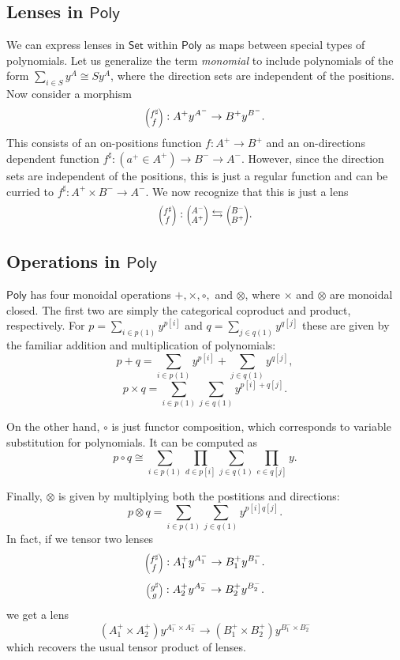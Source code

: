 \documentclass[12pt, a4paper]{article}
\theoremstyle{definition}
\theoremstyle{plain}
\theoremstyle{plain}
\theoremstyle{plain}
\theoremstyle{plain}
\theoremstyle{plain}
\theoremstyle{remark}
\theoremstyle{remark}
\newcommand{\lens}[2]{\scaleobj{0.6}{\begin{pmatrix} \scaleobj{1.3}{{#1}} \\ \scaleobj{1.3}{{#2}} \end{pmatrix}}}
\begin{document}
\subsection{Lenses in $\mathsf{Poly}$}
We can express lenses in $\mathsf{Set}$ within $\mathsf{Poly}$ as maps between special types of polynomials. Let us generalize the term \emph{monomial} to include polynomials of the form $\sum_{i \in S} y^{A} \cong S y^A$, where the direction sets are independent of the positions. Now consider a morphism
$$\lens{f^\sharp}{f} :A^+ y^{A^-} \rightarrow B^+ y^{B^-} .$$
This consists of an on-positions function $f: A^+ \rightarrow B^+$ and an on-directions dependent function $f^\sharp : (a^+ \in A^+) \rightarrow B^- \rightarrow A^-$. However, since the direction sets are independent of the positions, this is just a regular function and can be curried to $f^\sharp: A^+ \times B^- \rightarrow A^-$. We now recognize that this is just a lens
$$\lens{f^\sharp}{f} : \lens{A^-}{A^+} \leftrightarrows \lens{B^-}{B^+}.$$

\subsection{Operations in $\mathsf{Poly}$}
$\mathsf{Poly}$ has four monoidal operations $+, \times,\circ,$ and $\otimes$, where $\times$ and $\otimes$ are monoidal closed. The first two are simply the categorical coproduct and product, respectively. For $p = \sum_{i \in p(1)} y^{p[i]}$ and $q = \sum_{j \in q(1)} y^{q[j]}$ these are given by the familiar addition and multiplication of polynomials:
$$p + q = \sum_{i \in p(1)} y^{p[i]} + \sum_{j \in q(1)} y^{q[j]},$$
$$p \times q = \sum_{i \in p(1)}\sum_{j \in q(1)} y^{p[i]+q[j]}.$$

On the other hand, $\circ$ is just functor composition, which corresponds to variable substitution for polynomials. It can be computed as
$$p \circ q \cong \sum_{i \in p(1)} \prod_{d \in p[i]} \sum_{j \in q(1)} \prod_{e \in q[j]} y .$$

Finally, $\otimes$ is given by multiplying both the postitions and directions:
$$p \otimes q = \sum_{i \in p(1)} \sum_{j \in q(1)} y^{p[i]q[j]}.$$
In fact, if we tensor two lenses 
$$\lens{f^\sharp}{f} :A^+_1 y^{A^-_1} \rightarrow B^+_1 y^{B^-_1} .$$
$$\lens{g^\sharp}{g} :A^+_2 y^{A^-_2} \rightarrow B^+_2 y^{B^-_2} .$$
we get a lens
$$(A^+_1 \times A^+_2)  y^{A^-_1 \times A^-_2} \rightarrow (B^+_1 \times B^+_2)y^{B^-_1 \times B^-_2}$$
which recovers the usual tensor product of lenses.
\end{document}
